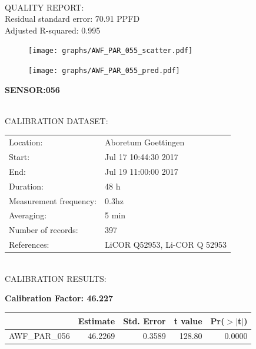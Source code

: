 \documentclass[oneside]{report}
\begin{document}
\hrulefill\\
QUALITY REPORT:\\
Residual standard error: 70.91 PPFD\\
Adjusted R-squared: 0.995



\begin{figure}[H]
  \centering
  \texttt{[image: graphs/AWF\_PAR\_055\_scatter.pdf]}
\end{figure}




\begin{figure}[H]
  \centering
  \texttt{[image: graphs/AWF\_PAR\_055\_pred.pdf]}
\end{figure}

\pagebreak


\begin{center}
\large{\textbf{SENSOR:056}}\\
\end{center}

\hrulefill\\
CALIBRATION DATASET:\\
\begin{table}[h!]
  \centering
  \label{tab:table1}
  \begin{tabular}{ll}
    Location: & Aboretum Goettingen\\ 
    
    
    Start:  & Jul 17 10:44:30 2017 \\
    End:   & Jul 19 11:00:00 2017\\ 
    Duration: & 48 h\\
    Measurement frequency: & 0.3hz\\
    Averaging:  &5 min\\
    Number of records: & 397 \\
    References: & LiCOR Q52953, Li-COR Q 52953 \\
  \end{tabular}
\end{table}

\hrulefill\\
CALIBRATION RESULTS:\\


\begin{center}
\textbf{\large{Calibration Factor: 46.227}}\\
\end{center}
\begin{table}[ht]
\centering
\begin{tabular}{rrrrr}
  \hline
 & Estimate & Std. Error & t value & Pr($>$$|$t$|$) \\ 
  \hline
AWF\_PAR\_056 & 46.2269 & 0.3589 & 128.80 & 0.0000 \\ 
   \hline
\end{tabular}
\end{table}
\end{document}
